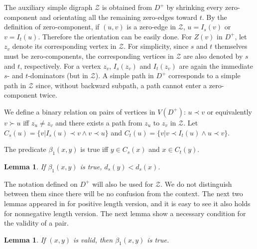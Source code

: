 \documentclass[review]{elsarticle}
\def\squarebox#1{\hbox to #1{\hfill\vbox to #1{\vfill}}}
\renewcommand{\qed}{\hspace*{\fill}
            \vbox{\hrule\hbox{\vrule\squarebox{.667em}\vrule}\hrule}\smallskip\newline}
\newtheorem{lem}[thm]{Lemma}
\begin{document}
The auxiliary simple digraph $\mathcal{Z}$ is obtained from $D^+$ by
shrinking every zero-component and orientating all the remaining
zero-edges toward $t$. By the definition of zero-component, if
$(u,v)$ is a zero-edge in $\mathcal{Z}$, $u=I_s(v)$ or $v=I_t(u)$.
Therefore the orientation can be easily done. For $Z(v)$ in $D^+$,
let $z_v$ denote its corresponding vertex in $\mathcal{Z}$. For
simplicity, since $s$ and $t$ themselves must be zero-components,
the corresponding vertices in $\mathcal{Z}$ are also denoted by $s$
and $t$, respectively. For a vertex $z_v$, $I_s(z_v)$ and $I_t(z_v)$
are again the immediate $s$- and $t$-dominators (but in
$\mathcal{Z}$). A simple path in $D^+$ corresponds to a simple path
in $\mathcal{Z}$ since, without backward subpath, a path cannot
enter a zero-component twice.

\begin{defi}
We define a binary relation on pairs of vertices in $V(D^+)$:
$u\prec v$ or equivalently $v\succ u$ iff $z_u\neq z_v$ and there
exists a path from $z_u$ to $z_v$ in $\mathcal{Z}$. Let $C_s(u)=\{v|
I_s(u)\prec v \wedge v\prec u\}$ and $C_t(u)=\{v| v\prec I_t(u)
\wedge u\prec v\}$.
\end{defi}

\begin{defi}
The predicate $\beta_1(x,y)$ is true iff $y\in C_s(x)$ and $x\in
C_t(y)$.
\end{defi}

\begin{lem}\label{beta1a}
If $\beta_1(x,y)$ is true, $d_s(y)<d_s(x)$.
\end{lem}


The notation defined on $D^+$ will also be used for $\mathcal{Z}$.
We do not distinguish between them since there will be no confusion
from the context. The next two lemmas appeared in \cite{wu10} for
positive length version, and it is easy to see it also holds for
nonnegative length version. The next lemma show a necessary
condition for the validity of a pair.
\begin{lem}\label{back_nec}
If $(x,y)$ is valid, then $\beta_1(x,y)$ is true.
\end{lem}
\end{document}
